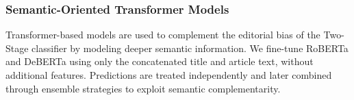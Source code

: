 \subsubsection{Semantic-Oriented Transformer Models}

Transformer-based models are used to complement the editorial bias of the
Two-Stage classifier by modeling deeper semantic information. We fine-tune
RoBERTa and DeBERTa using only the concatenated title and article text, without
additional features. Predictions are treated independently and later combined
through ensemble strategies to exploit semantic complementarity.
